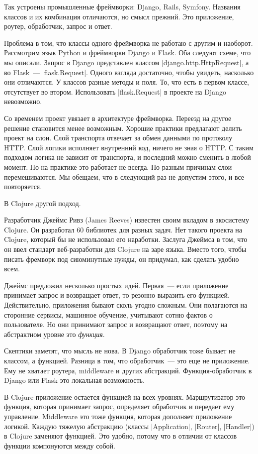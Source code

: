 Так устроены промышленные фреймворки: Django, Rails, Symfony. Названия классов и
их комбинация отличаются, но смысл прежний. Это приложение, роутер, обработчик,
запрос и ответ.

Проблема в том, что классы одного фреймворка не работаю с другим и
наоборот. Рассмотрим язык Python и фреймворки Django и Flask. Оба следуют схеме,
что мы описали. Запрос в Django представлен классом
\spverb|django.http.HttpRequest|, а во Flask~--- \spverb|flask.Request|. Одного
взгляда достаточно, чтобы увидеть, насколько они отличаются. У классов разные
методы и поля. То, что есть в первом классе, отсутствует во втором. Использовать
\spverb|flask.Request| в проекте на Django невозможно.

Со временем проект увязает в архитектуре фреймворка. Переезд на другое решение
становится менее возможным. Хорошие практики предлагают делить проект на
слои. Слой транспорта отвечает за обмен данными по протоколу HTTP. Слой логики
исполняет внутренний код, ничего не зная о HTTP. С таким подходом логика не
зависит от транспорта, и последний можно сменить в любой момент. Но на практике
это работает не всегда. По разным причинам слои перемешиваются. Мы обещаем, что
в следующий раз не допустим этого, и все повторяется.

В Clojure другой подход.

Разработчик Джеймс Ривз (James Reeves)
известен своим вкладом в экосистему Clojure. Он разработал 60 библиотек для
разных задач. Нет такого проекта на Clojure, который бы не использовал его
наработки. Заслуга Джеймса в том, что он ввел стандарт веб-разработки для
Clojure на заре языка. Вместо того, чтобы писать фремворк под сиюминутные нужды,
он придумал, как сделать удобно всем.

Джеймс предложил несколько простых идей. Первая~--- если приложение принимает
запрос и возвращает ответ, то резонно выразить его функцией. Действительно,
приложения бывают сколь угодно сложным. Они полагаются на сторонние сервисы,
машинное обучение, учитывают сотню фактов о пользователе. Но они принимают
запрос и возвращают ответ, поэтому на абстрактном уровне это \emph{функция}.

Скептики заметят, что мысль не нова. В Django обработчик тоже бывает не классом,
а функцией. Разница в том, что обработчик~--- это еще не приложение. Ему не
хватает роутера, middleware и других абстракций. Функция-обработчик в Django или
Flask это локальная возможность.

В Clojure приложение остается функцией на всех уровнях. Маршрутизатор это
функция, которая принимает запрос, определяет обработчик и передает ему
управление. Middleware это тоже функция, которая дополняет приложение
логикой. Каждую тяжелую абстракцию (классы \spverb|Application|,
\spverb|Router|, \spverb|Handler|) в Clojure заменяют функцией. Это удобно,
потому что в отличии от классов функции компонуются между собой.

